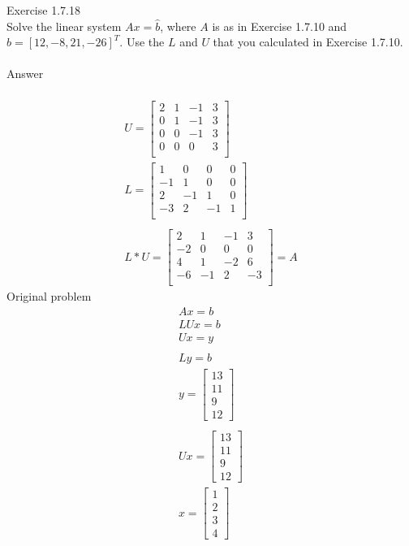 \documentclass[10pt,a4paper]{article}
\author{Daniel Frederico Lins Leite}
\begin{document}
	
	Exercise 1.7.18\\
	Solve the linear system $Ax = \hat{b}$, where $A$ is as in Exercise 1.7.10 and $\hat{b} = [12, -8, 21, -26]^T$. Use the $L$ and $U$ that you calculated in Exercise 1.7.10.\\
	\\
	Answer\\
	\\
	\begin{align*}
	U = \begin{bmatrix}	
	2  &  1 &  -1  &  3\\
	0  &  1 &  -1  &  3\\
	0  &  0 &  -1  &  3\\
	0  &  0 &   0  &  3\\
	\end{bmatrix}\\
	L = \begin{bmatrix}	
	 1 & 0 & 0 & 0\\
	-1 & 1 & 0 & 0\\
	 2 & -1 & 1 & 0\\
	-3 &  2 & -1 & 1\\
	\end{bmatrix}\\
	\\
	L*U = \begin{bmatrix}
	2 &  1 & -1 &  3\\
	-2 &  0 &  0 &  0\\
	4  & 1 & -2  & 6\\
	-6 & -1 &  2 & -3\\	
	\end{bmatrix} = A
	\end{align*}	
	Original problem\\
	\begin{align*}
		Ax = b\\
		LUx = b\\
		Ux = y\\
		\\
		Ly = b\\
		y = \begin{bmatrix}13 \\ 11  \\ 9 \\ 12 \end{bmatrix}\\
		\\
		Ux = \begin{bmatrix}13 \\ 11  \\ 9 \\ 12 \end{bmatrix}\\
		x = \begin{bmatrix}1\\2\\3\\4\end{bmatrix}\\
	\end{align*}
\end{document}
